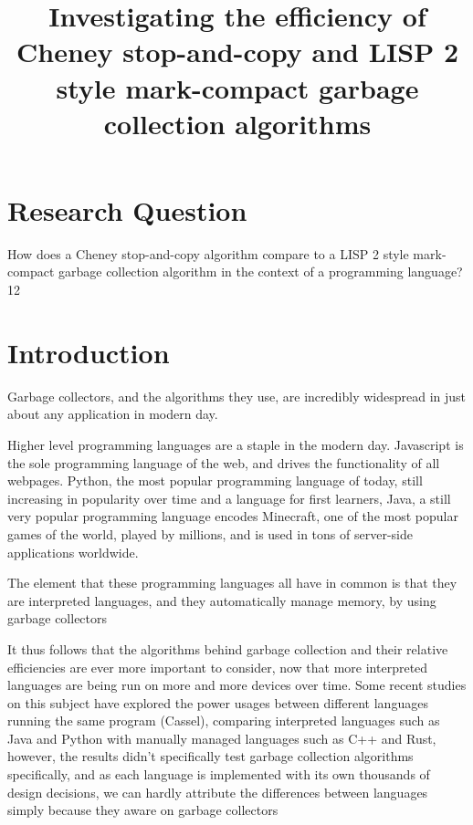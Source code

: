 \documentclass[index]{subfiles}
\begin{document}
\title{Investigating the efficiency of Cheney stop-and-copy and LISP 2 style mark-compact garbage collection algorithms}
\date{}
\author{}
\maketitle

\section{Research Question}

How does a Cheney stop-and-copy algorithm compare to a LISP 2 style mark-compact garbage collection algorithm in the context of a programming language? \cite{build_your_own_openjdk_gc}12

\section{Introduction}

Garbage collectors, and the algorithms they use, are incredibly widespread in just about any application in modern day.

Higher level programming languages are a staple in the modern day. Javascript is the sole programming language of the web, and drives the functionality of all webpages. Python, the most popular programming language of today, still increasing in popularity over time and a language for first learners, Java, a still very popular programming language encodes Minecraft, one of the most popular games of the world, played by millions, and is used in tons of server-side applications worldwide.

The element that these programming languages all have in common is that they are interpreted languages, and they automatically manage memory, by using garbage collectors

It thus follows that the algorithms behind garbage collection and their relative efficiencies are ever more important to consider, now that more interpreted languages are being run on more and more devices over time. Some recent studies on this subject have explored the power usages between different languages running the same program (Cassel), comparing interpreted languages such as Java and Python with manually managed languages such as C++ and Rust, however, the results didn't specifically test garbage collection algorithms specifically, and as each language is implemented with its own thousands of design decisions, we can hardly attribute the differences between languages simply because they aware on garbage collectors
\end{document}
